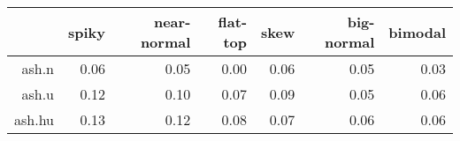 \begin{tabular}{rrrrrrr}
  \toprule  & spiky & near-normal & flat-top & skew & big-normal & bimodal \\ 
  \midrule ash.n & 0.06 & 0.05 & 0.00 & 0.06 & 0.05 & 0.03 \\ 
  ash.u & 0.12 & 0.10 & 0.07 & 0.09 & 0.05 & 0.06 \\ 
  ash.hu & 0.13 & 0.12 & 0.08 & 0.07 & 0.06 & 0.06 \\ 
   \bottomrule \end{tabular}

